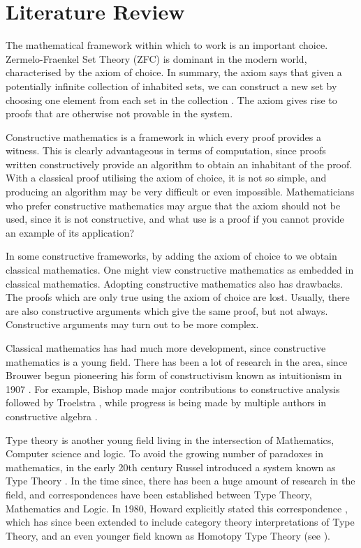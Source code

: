 \documentclass[ProjectReport]{subfiles}
\begin{document}
\section{Literature Review}
The mathematical framework within which to work is an important choice. Zermelo-Fraenkel Set Theory (ZFC) is dominant in the modern world, characterised by the axiom of choice. In summary, the axiom says that given a potentially infinite collection of inhabited sets, we can construct a new set by choosing one element from each set in the collection \cite{choiceaxiom}. The axiom gives rise to proofs that are otherwise not provable in the system. 

Constructive mathematics is a framework in which every proof provides a witness. This is clearly advantageous in terms of computation, since proofs written constructively provide an algorithm to obtain an inhabitant of the proof. With a classical proof utilising the axiom of choice, it is not so simple, and producing an algorithm may be very difficult or even impossible. Mathematicians who prefer constructive mathematics may argue that the axiom should not be used, since it is not constructive, and what use is a proof if you cannot provide an example of its application? 

In some constructive frameworks, by adding the axiom of choice to we obtain classical mathematics. One might view constructive mathematics as embedded in classical mathematics. Adopting constructive mathematics also has drawbacks. The proofs which are only true using the axiom of choice are lost. Usually, there are also constructive arguments which give the same proof, but not always. Constructive arguments may turn out to be more complex. 

Classical mathematics has had much more development, since constructive mathematics is a young field. There has been a lot of research in the area, since Brouwer begun pioneering his form of constructivism known as intuitionism in 1907 \cite{Brouwer}. For example, Bishop made major contributions to constructive analysis \cite{Bishop1987-BISCA-2} followed by Troelstra \cite{Troelstra1973-TROMIO}, while progress is being made by multiple authors in constructive algebra \cite{2015}.

Type theory is another young field living in the intersection of Mathematics, Computer science and logic. To avoid the growing number of paradoxes in mathematics, in the early 20th century Russel introduced a system known as Type Theory \cite{coquand_type_2018}. In the time since, there has been a huge amount of research in the field, and correspondences have been established between Type Theory, Mathematics and Logic. In 1980, Howard explicitly stated this correspondence \cite{Howard1980-HOWTFN-2}, which has since been extended to include category theory interpretations of Type Theory, and an even younger field known as Homotopy Type Theory (see \cite{hottbook}). 
\end{document}
